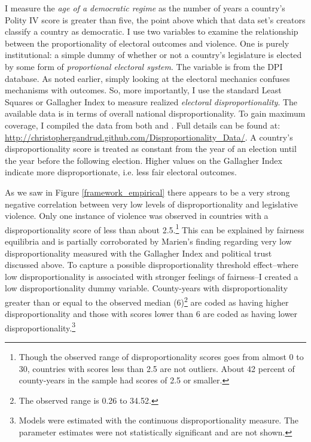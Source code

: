 \documentclass[a4paper]{article}\usepackage[]{graphicx}\usepackage[]{color}
\begin{document}
I measure the {\emph{age of a democratic regime}} as the number of years a country's Polity IV score \citep{Marshall2009} is greater than five, the point above which that data set's creators classify a country as democratic. I use two variables to examine the relationship between the proportionality of electoral outcomes and violence. One is purely institutional: a simple dummy of whether or not a country's legislature is elected by some form of {\emph{proportional electoral system}}. The variable is from the DPI database. As noted earlier, simply looking at the electoral mechanics confuses mechanisms with outcomes. So, more importantly, I use the standard Least Squares or Gallagher Index \citep{Gallagher1991} to measure realized {\emph{electoral disproportionality}}. The available data is in terms of overall national disproportionality. To gain maximum coverage, I compiled the data from both \cite{Gallagher2012} and \cite{Carey2011}. Full details can be found at: \url{http://christophergandrud.github.com/Disproportionality_Data/}. A country's disproportionality score is treated as constant from the year of an election until the year before the following election. Higher values on the Gallagher Index indicate more disproportionate, i.e. less fair electoral outcomes.

As we saw in Figure \ref{framework_empirical} there appears to be a very strong negative correlation between very low levels of disproportionality and legislative violence. Only one instance of violence was observed in countries with a disproportionality score of less than about 2.5.\footnote{Though the observed range of disproportionality scores goes from almost 0 to 30, countries with scores less than 2.5 are not outliers. About 42 percent of county-years in the sample had scores of 2.5 or smaller.} This can be explained by fairness equilibria and is partially corroborated by Marien's \citeyearpar{Marien2011} finding regarding very low disproportionality measured with the Gallagher Index and political trust discussed above. To capture a possible disproportionality threshold effect--where low disproportionality is associated with stronger feelings of fairness--I created a low disproportionality dummy variable. County-years with disproportionality greater than or equal to the observed median (6)\footnote{The observed range is 0.26 to 34.52.} are coded as having higher disproportionality and those with scores lower than 6 are coded as having lower disproportionality.\footnote{Models were estimated with the continuous disproportionality measure. The parameter estimates were not statistically significant and are not shown.}
\end{document}
